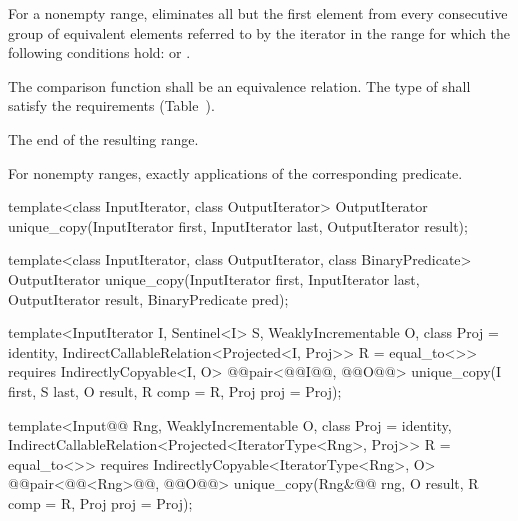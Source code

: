 \begin{itemdescr}
\pnum
\effects
For a nonempty range, eliminates all but the first element from every
consecutive group of equivalent elements referred to by the iterator
in the range
for which the following conditions hold:
or
.

\begin{removedblock}
\pnum
\requires
The comparison function shall be an equivalence relation.
The type of  shall satisfy the
 requirements (Table~).
\end{removedblock}

\pnum
\returns
The end of the resulting range.

\pnum
\complexity
For nonempty ranges, exactly
applications of the corresponding predicate.
\end{itemdescr}

%
\begin{removedblock}
\begin{itemdecl}
template<class InputIterator, class OutputIterator>
  OutputIterator
    unique_copy(InputIterator first, InputIterator last,
                OutputIterator result);

template<class InputIterator, class OutputIterator,
         class BinaryPredicate>
  OutputIterator
    unique_copy(InputIterator first, InputIterator last,
                OutputIterator result, BinaryPredicate pred);
\end{itemdecl}
\end{removedblock}
\begin{addedblock}
\begin{itemdecl}
template<InputIterator I, Sentinel<I> S, WeaklyIncrementable O,
    class Proj = identity, IndirectCallableRelation<Projected<I, Proj>> R = equal_to<>>
  requires IndirectlyCopyable<I, O>
  @@pair<@@I@\newtxt{)}@, @@O@\newtxt{)}@>
    unique_copy(I first, S last, O result, R comp = R{}, Proj proj = Proj{});

template<Input@@ Rng, WeaklyIncrementable O, class Proj = identity,
    IndirectCallableRelation<Projected<IteratorType<Rng>, Proj>> R = equal_to<>>
  requires IndirectlyCopyable<IteratorType<Rng>, O>
  @@pair<@@<Rng>@\newtxt{)}@, @@O@\newtxt{)}@>
    unique_copy(Rng&@\newtxt{\&}@ rng, O result, R comp = R{}, Proj proj = Proj{});
\end{itemdecl}
\end{addedblock}

